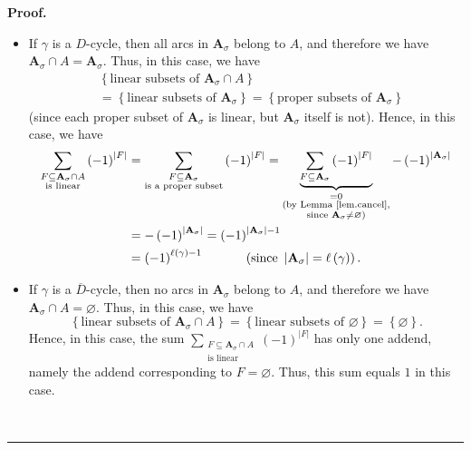 \documentclass[numbers=enddot,12pt,final,onecolumn,notitlepage]{scrartcl}%
\numberwithin{exer}{section}
\theoremstyle{definition}
\newenvironment{proof}[1][Proof]{\noindent\textbf{#1.} }{\ \rule{0.5em}{0.5em}}
\let\sumnonlimits\sum
\renewcommand{\sum}{\sumnonlimits\limits}
\newenvironment{vershort}{}{}
\begin{document}
\begin{vershort}
\begin{proof}
\begin{itemize}
\item If $\gamma$ is a $D$-cycle, then all arcs in $\mathbf{A}_{\sigma}$
belong to $A$, and therefore we have $\mathbf{A}_{\sigma}\cap A=\mathbf{A}%
_{\sigma}$. Thus, in this case, we have%
\begin{align*}
&  \left\{  \text{linear subsets of }\mathbf{A}_{\sigma}\cap A\right\} \\
&  =\left\{  \text{linear subsets of }\mathbf{A}_{\sigma}\right\}  =\left\{
\text{proper subsets of }\mathbf{A}_{\sigma}\right\}
\end{align*}
(since each proper subset of $\mathbf{A}_{\sigma}$ is linear, but
$\mathbf{A}_{\sigma}$ itself is not). Hence, in this case, we have%
\begin{align*}
\sum_{\substack{F\subseteq\mathbf{A}_{\sigma}\cap A\\\text{is linear}}}\left(
-1\right)  ^{\left\vert F\right\vert }  &  =\sum_{\substack{F\subseteq
\mathbf{A}_{\sigma}\\\text{is a proper subset}}}\left(  -1\right)
^{\left\vert F\right\vert }=\underbrace{\sum_{F\subseteq\mathbf{A}_{\sigma}%
}\left(  -1\right)  ^{\left\vert F\right\vert }}_{\substack{=0\\\text{(by
Lemma \ref{lem.cancel},}\\\text{since }\mathbf{A}_{\sigma}\neq\varnothing
\text{)}}}-\left(  -1\right)  ^{\left\vert \mathbf{A}_{\sigma}\right\vert }\\
&  =-\left(  -1\right)  ^{\left\vert \mathbf{A}_{\sigma}\right\vert }=\left(
-1\right)  ^{\left\vert \mathbf{A}_{\sigma}\right\vert -1}\\
&  =\left(  -1\right)  ^{\ell\left(  \gamma\right)  -1}%
\ \ \ \ \ \ \ \ \ \ \left(  \text{since }\left\vert \mathbf{A}_{\sigma
}\right\vert =\ell\left(  \gamma\right)  \right)  .
\end{align*}


\item If $\gamma$ is a $\overline{D}$-cycle, then no arcs in $\mathbf{A}%
_{\sigma}$ belong to $A$, and therefore we have $\mathbf{A}_{\sigma}\cap
A=\varnothing$. Thus, in this case, we have%
\[
\left\{  \text{linear subsets of }\mathbf{A}_{\sigma}\cap A\right\}  =\left\{
\text{linear subsets of }\varnothing\right\}  =\left\{  \varnothing\right\}
.
\]
Hence, in this case, the sum $\sum_{\substack{F\subseteq\mathbf{A}_{\sigma
}\cap A\\\text{is linear}}}\left(  -1\right)  ^{\left\vert F\right\vert }$ has
only one addend, namely the addend corresponding to $F=\varnothing$. Thus,
this sum equals $1$ in this case.


\end{itemize}
\end{proof}
\end{vershort}
\end{document}
